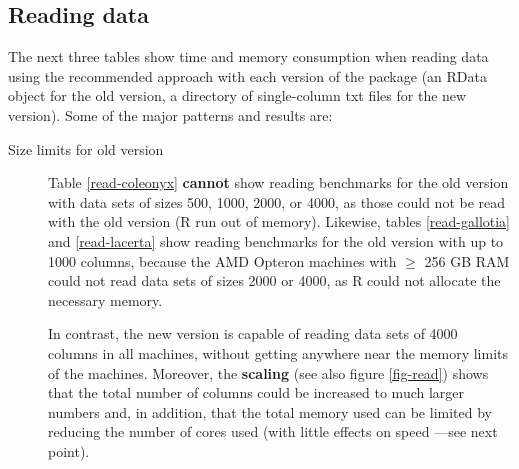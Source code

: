 \documentclass[a4paper,11pt]{article}
\begin{document}
\clearpage
\subsection{Reading data}\label{comp-read}

The next three tables show time and memory consumption when reading data
using the recommended approach with each version of the package (an RData
object for the old version, a directory of single-column txt files for the
new version). Some of the major patterns and results are:

\begin{description}
\item[Size limits for old version] Table
\ref{read-coleonyx} \textbf{cannot} show reading benchmarks for the old
version with data sets of sizes 500, 1000, 2000, or 4000, as those could
not be read with the old version (R run out of memory). Likewise, tables
\ref{read-gallotia} and \ref{read-lacerta} show reading benchmarks for the
old version with up to 1000 columns, because the AMD Opteron machines with
$\ge$ 256 GB RAM could not read data sets of sizes 2000 or
4000, as R could not allocate the necessary memory.%

In contrast, the new version is capable of reading data sets of 4000
columns in all machines, without getting anywhere near the memory limits
of the machines. Moreover, the \textbf{scaling} (see also figure
\ref{fig-read}) shows that the total number of columns could be increased
to much larger numbers and, in addition, that the total memory used can be
limited by reducing the number of cores used (with little effects on speed
---see next point).%



\end{description}
\end{document}
